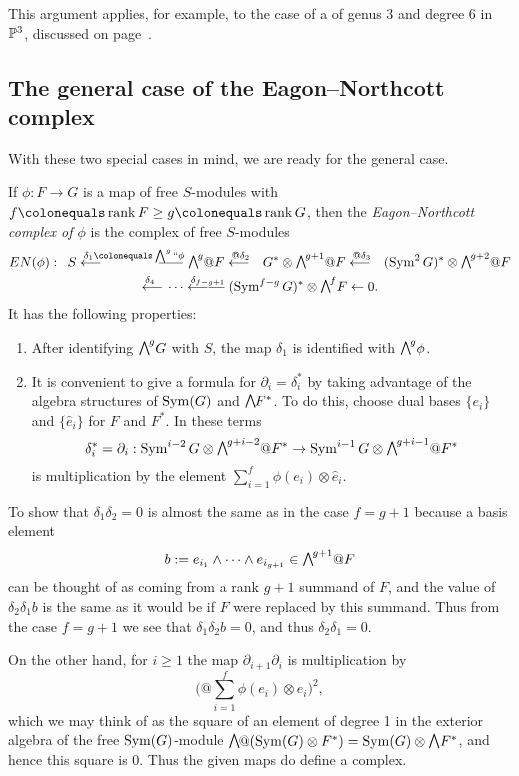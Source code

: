 This argument applies, for example,
to the case of a 
%
of genus 3 and
degree 6 in $\mathbb P^{3}$, discussed on page~\pageref{other genus 3}.

\subsection*{The general case of the Eagon--Northcott complex}

With these two special cases in mind, we are ready for the general
case. 

\begin{definition}
If $\phi: F\to G$ is a map of free $S$-modules with 
$f\colonequals \rank F\geq  g\colonequals  \rank G$, then the
\emph{Eagon--Northcott complex of $\phi$}
%
is the complex of free $S$-modules
\begin{multline*}
EN(\phi): \quad
S \luto{\delta_1\colonequals \ssty\bigwedge^g``\phi}\hskip-30pt-\hskip-4pt-\hskip-4pt-
\hskip3pt
\mwedge^g @F
\luto{@\delta_{2}}
G^*\otimes \mwedge^{g+1}@ F  \luto{@\delta_{3}}
(\Sym^2G)^*\otimes\mwedge^{g+2}@F  \\
\luto{\delta_{4}}\cdots\luto{\delta_{f-g+1}}\hskip-23pt-\hskip-4pt-
(\Sym^{f-g}G)^*\otimes\mwedge^fF
\leftarrow 0.
\end{multline*}
It has the following properties:
\begin{enumerate}

\item After identifying $\mwedge^{g}G$ with $S$, the map $\delta_{1}$
is identified with $\mwedge^{g}\phi$.

\item It is convenient to give a formula for $\partial_{i} =
\delta_{i}^{*}$ by taking advantage of the
algebra structures of $\operatorname{Sym}(G)$ and $\mwedge F^{*}$. To do this, choose
dual bases $\{e_{i}\}$ and $\{\hat e_{i}\}$ for $F$ and $F^{*}$. In
these terms
$$
\delta_{i}^{*} = \partial_{i}:
\Sym^{i-2}G \otimes \mwedge^{g+i-2}@F^{*} \to
\Sym^{i-1}G \otimes \mwedge^{g+i-1}@F^{*}
$$
is multiplication by the element
$\sum_{i = 1}^{f} \phi(e_{i}) \otimes \hat e_{i}$.
\end{enumerate}

To show that $\delta_{1}\delta_{2} = 0$ is almost the same as in the
case $f = g+1$ because
a basis element
$$
b: = e_{i_{1}}\wedge \cdots \wedge e_{i_{g+1}} \in \mwedge^{g+1}@F
$$
can be thought of as coming from a rank $g+1$ summand of $F$, and the
value of $\delta_{2}\delta_{1}b$
is the same as it would be if $F$ were replaced by this summand. Thus
from the case $f=g+1$ we see
that $\delta_{1}\delta_{2}b = 0$, and thus $\delta_{2}\delta_{1} = 0$.

On the other hand, for $i\geq 1$ the map $\partial_{i+1}\partial_{i}$
is multiplication by
$$
\biggl(@\sum_{i = 1}^{f} \phi(e_{i}) \otimes \hat e_{i}\biggr)^{\!2},
$$
which we may think of as the square of an element of degree 1 in the
exterior algebra
of the free $\operatorname{Sym}(G)$-module $\mwedge@(\Sym(G)\otimes F^{*}) = \Sym(G)
\otimes \mwedge \,F^{*}$, and hence this square is 0.
Thus the given maps do define a complex.
\end{definition}

